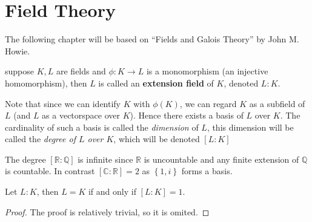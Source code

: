 \chapter{Field Theory}
The following chapter will be based on ``Fields and Galois Theory'' by John M. Howie.
\begin{definition}
  suppose $K, L$ are fields and $\phi: K \to L$ is a monomorphism (an injective homomorphism), then $L$ is called an \textbf{extension field} of $K$, denoted $L : K$.
\end{definition}
Note that since we can identify $K$ with $\phi(K)$, we can regard $K$ as a subfield of $L$ (and $L$ as a vectorspace over $K$). Hence there exists a basis of $L$ over $K$. The cardinality of such a basis is called the \textit{dimension } of $L$, this dimension will be called the \textit{degree of $L$ over $K$}, which will be denoted $[L : K]$
\begin{example}\label{exmp:}
  The degree $[\mathbb{R} : \mathbb{Q}]$ is infinite since $\mathbb{R}$ is uncountable and any finite extension of $\mathbb{Q}$ is countable. In contrast $[\mathbb{C} : \mathbb{R}] = 2$ as $\left\{1, i\right\}$ forms a basis.
\end{example}
\begin{theorem}\label{thm:degree1}
  Let $L : K$, then $L = K$ if and only if $[L : K] = 1$.
\end{theorem}
\begin{proof}
The proof is relatively trivial, so it is omited.
\end{proof}

